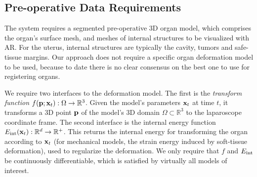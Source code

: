 \subsection{Pre-operative Data Requirements}
\label{sec:inputModels}
The system requires a segmented pre-operative 3D organ model, which comprises the organ's surface mesh, and meshes of internal structures to be visualized with AR.
For the uterus, internal structures are typically the cavity, tumors and safe-tissue margins. %
Our approach does not require a specific organ deformation model to be used, because to date there is no clear consensus on the best one to use for registering organs. %

We require two interfaces to the deformation model. 
The first is the \emph{transform function} $f(\mathbf{p};\mathbf{x}_t): \Omega\rightarrow \mathbb{R}^3$.
Given the model's parameters $\mathbf{x}_t$ at time $t$, it transforms a 3D point $\mathbf{p}$ of the model's 3D domain $\Omega\subset \mathbb{R}^3$ to the laparoscope coordinate frame. 
The second interface is the internal energy function $E_{\text{int}}(\mathbf{x}_{t}):\mathbb{R}^{d}\rightarrow\mathbb{R}^{+}$. This returns the internal energy for transforming the organ according to $\mathbf{x}_t$ (for mechanical models, the strain energy induced by soft-tissue deformation), used to regularize the deformation.
We only require that $f$ and $E_{\text{int}}$ be continuously differentiable, which is satisfied by virtually all models of interest.
 
